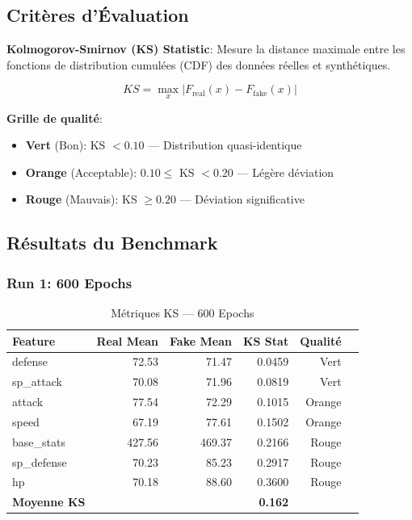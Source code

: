 \documentclass[11pt,a4paper]{article}
\begin{document}
\subsection{Critères d'Évaluation}

\textbf{Kolmogorov-Smirnov (KS) Statistic}: Mesure la distance maximale entre les fonctions de distribution cumulées (CDF) des données réelles et synthétiques.

\[
KS = \max_{x} |F_{\text{real}}(x) - F_{\text{fake}}(x)|
\]

\textbf{Grille de qualité}:
\begin{itemize}
    \item \textbf{Vert} (Bon): KS $< 0.10$ — Distribution quasi-identique
    \item \textbf{Orange} (Acceptable): $0.10 \leq$ KS $< 0.20$ — Légère déviation
    \item \textbf{Rouge} (Mauvais): KS $\geq 0.20$ — Déviation significative
\end{itemize}

\subsection{Résultats du Benchmark}

\subsubsection{Run 1: 600 Epochs}

\begin{table}[H]
\centering
\caption{Métriques KS — 600 Epochs}
\small
\begin{tabular}{lrrrrr}
\toprule
\textbf{Feature} & \textbf{Real Mean} & \textbf{Fake Mean} & \textbf{KS Stat} & \textbf{Qualité} \\
\midrule
defense & 72.53 & 71.47 & 0.0459 & \cellcolor{green!20}Vert \\
sp\_attack & 70.08 & 71.96 & 0.0819 & \cellcolor{green!20}Vert \\
attack & 77.54 & 72.29 & 0.1015 & \cellcolor{yellow!30}Orange \\
speed & 67.19 & 77.61 & 0.1502 & \cellcolor{yellow!30}Orange \\
base\_stats & 427.56 & 469.37 & 0.2166 & \cellcolor{red!20}Rouge \\
sp\_defense & 70.23 & 85.23 & 0.2917 & \cellcolor{red!20}Rouge \\
hp & 70.18 & 88.60 & 0.3600 & \cellcolor{red!20}Rouge \\
\midrule
\textbf{Moyenne KS} & & & \textbf{0.162} & \\
\bottomrule
\end{tabular}
\end{table}
\end{document}
